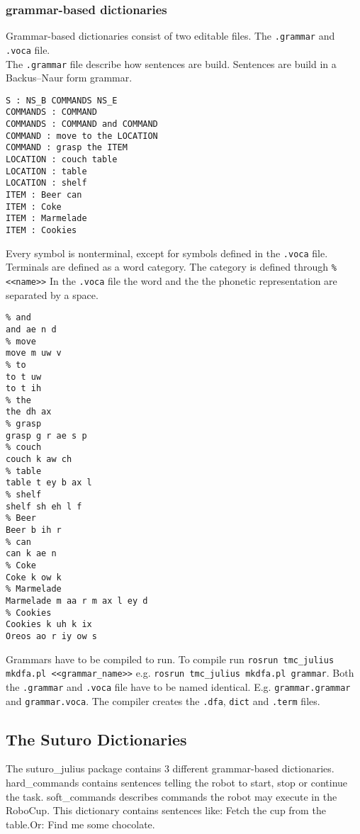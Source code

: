 \documentclass[main.tex]{subfiles}
\begin{document}
    \subsubsection{grammar-based dictionaries}
        Grammar-based dictionaries consist of two editable files. The \texttt{.grammar} and \texttt{.voca} file.\\
        The \texttt{.grammar} file describe how sentences are build. Sentences are build in a Backus–Naur form grammar.\\
        \begin{lstlisting}
S : NS_B COMMANDS NS_E
COMMANDS : COMMAND
COMMANDS : COMMAND and COMMAND
COMMAND : move to the LOCATION
COMMAND : grasp the ITEM
LOCATION : couch table
LOCATION : table
LOCATION : shelf
ITEM : Beer can
ITEM : Coke
ITEM : Marmelade
ITEM : Cookies
        \end{lstlisting}
        Every symbol is nonterminal, except for symbols defined in the \texttt{.voca} file. Terminals are defined as a word category. The category is defined through \newline \lstinline{% <<name>>}
        In the \texttt{.voca} file the word and the the phonetic representation are separated by a space.
        \begin{lstlisting}
% and
and ae n d
% move
move m uw v
% to
to t uw
to t ih
% the
the dh ax
% grasp
grasp g r ae s p
% couch
couch k aw ch
% table
table t ey b ax l
% shelf
shelf sh eh l f
% Beer
Beer b ih r
% can
can k ae n
% Coke
Coke k ow k
% Marmelade
Marmelade m aa r m ax l ey d
% Cookies
Cookies k uh k ix
Oreos ao r iy ow s
        \end{lstlisting}
        
        Grammars have to be compiled to run. To compile run \texttt{rosrun tmc\_julius mkdfa.pl <<grammar\_name>>} e.g. \texttt{rosrun tmc\_julius mkdfa.pl grammar}. Both the \texttt{.grammar} and \texttt{.voca} file have to be named identical. E.g. \texttt{grammar.grammar} and \texttt{grammar.voca}. The compiler creates the \texttt{.dfa}, \texttt{dict} and \texttt{.term} files.	
    
    \subsection{The Suturo Dictionaries}
        The suturo\_julius package contains 3 different grammar-based dictionaries. hard\_commands contains sentences telling the robot to start, stop or continue the task.
        soft\_commands describes commands the robot may execute in the RoboCup. This dictionary contains sentences like: Fetch the cup from the table.Or: Find me some chocolate.
\end{document}

